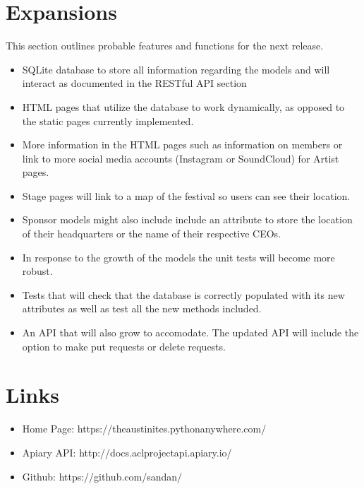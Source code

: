 \documentclass[12pt,english]{scrartcl}
\begin{document}
\section{Expansions}
This section outlines probable features and functions for the next release.
\begin{itemize}
\item SQLite database to store all information regarding the models and will interact as documented in the RESTful API section

\item HTML pages that utilize the database to work dynamically, as opposed to the static pages currently implemented.

\item More information in the HTML pages such as information on members or link to more social media accounts (Instagram or SoundCloud) for Artist pages.

\item Stage pages will link to a map of the festival so users can see their location.

\item Sponsor models might also include include an attribute to store the location of their headquarters or the name of their respective CEOs.

\item In response to the growth of the models the unit tests will become more robust.

\item  Tests that will check that the database is correctly populated with its new attributes as well as test all the new methods included.

\item An API that will also grow to accomodate. The updated API will include the option to make put requests or delete requests.
\end{itemize}
\section{Links}
\begin{itemize}
 \item Home Page: https://theaustinites.pythonanywhere.com/
 \item Apiary API: http://docs.aclprojectapi.apiary.io/
 \item Github: https://github.com/sandan/
\end{itemize}
\end{document}
